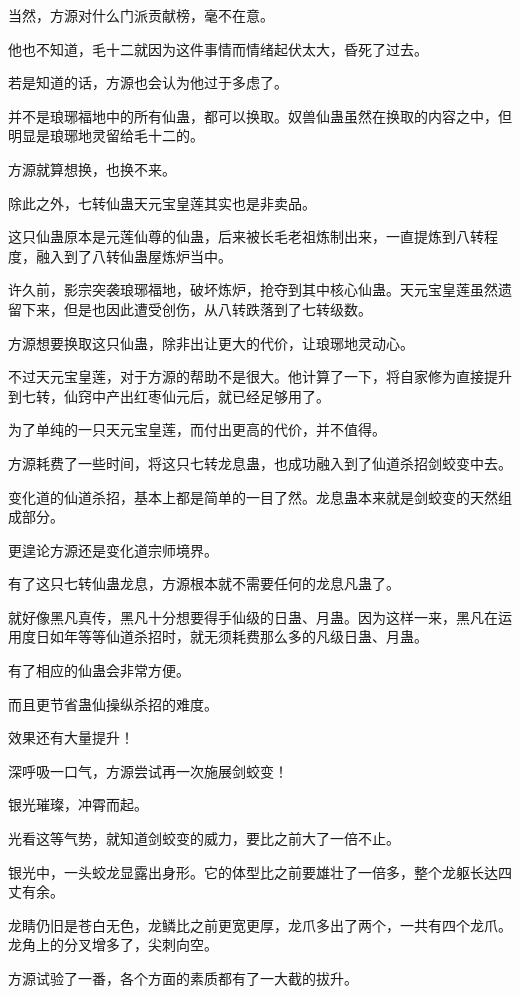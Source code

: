 \begin{this_body}
当然，方源对什么门派贡献榜，毫不在意。

他也不知道，毛十二就因为这件事情而情绪起伏太大，昏死了过去。

若是知道的话，方源也会认为他过于多虑了。

并不是琅琊福地中的所有仙蛊，都可以换取。奴兽仙蛊虽然在换取的内容之中，但明显是琅琊地灵留给毛十二的。

方源就算想换，也换不来。

除此之外，七转仙蛊天元宝皇莲其实也是非卖品。

这只仙蛊原本是元莲仙尊的仙蛊，后来被长毛老祖炼制出来，一直提炼到八转程度，融入到了八转仙蛊屋炼炉当中。

许久前，影宗突袭琅琊福地，破坏炼炉，抢夺到其中核心仙蛊。天元宝皇莲虽然遗留下来，但是也因此遭受创伤，从八转跌落到了七转级数。

方源想要换取这只仙蛊，除非出让更大的代价，让琅琊地灵动心。

不过天元宝皇莲，对于方源的帮助不是很大。他计算了一下，将自家修为直接提升到七转，仙窍中产出红枣仙元后，就已经足够用了。

为了单纯的一只天元宝皇莲，而付出更高的代价，并不值得。

方源耗费了一些时间，将这只七转龙息蛊，也成功融入到了仙道杀招剑蛟变中去。

变化道的仙道杀招，基本上都是简单的一目了然。龙息蛊本来就是剑蛟变的天然组成部分。

更遑论方源还是变化道宗师境界。

有了这只七转仙蛊龙息，方源根本就不需要任何的龙息凡蛊了。

就好像黑凡真传，黑凡十分想要得手仙级的日蛊、月蛊。因为这样一来，黑凡在运用度日如年等等仙道杀招时，就无须耗费那么多的凡级日蛊、月蛊。

有了相应的仙蛊会非常方便。

而且更节省蛊仙操纵杀招的难度。

效果还有大量提升！

深呼吸一口气，方源尝试再一次施展剑蛟变！

银光璀璨，冲霄而起。

光看这等气势，就知道剑蛟变的威力，要比之前大了一倍不止。

银光中，一头蛟龙显露出身形。它的体型比之前要雄壮了一倍多，整个龙躯长达四丈有余。

龙睛仍旧是苍白无色，龙鳞比之前更宽更厚，龙爪多出了两个，一共有四个龙爪。龙角上的分叉增多了，尖刺向空。

方源试验了一番，各个方面的素质都有了一大截的拔升。


\end{this_body}
